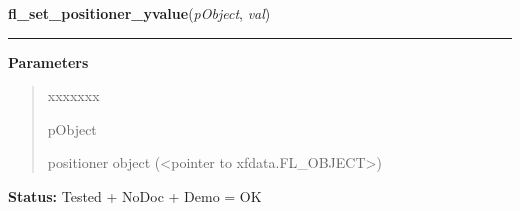 \hspace{.8\funcindent}\begin{boxedminipage}{\funcwidth}

    \raggedright \textbf{fl\_set\_positioner\_yvalue}(\textit{pObject}, \textit{val})

    \vspace{-1.5ex}

    \rule{\textwidth}{0.5\fboxrule}
\setlength{\parskip}{2ex}
\setlength{\parskip}{1ex}
      \textbf{Parameters}
      \vspace{-1ex}

      \begin{quote}
        \begin{Ventry}{xxxxxxx}

          \item[pObject]

          positioner object ({\textless}pointer to 
          xfdata.FL\_OBJECT{\textgreater})

        \end{Ventry}

      \end{quote}

\textbf{Status:} Tested + NoDoc + Demo = OK



    \end{boxedminipage}

    \label{xformslib:library:fl_get_positioner_yvalue}

    \vspace{0.5ex}

